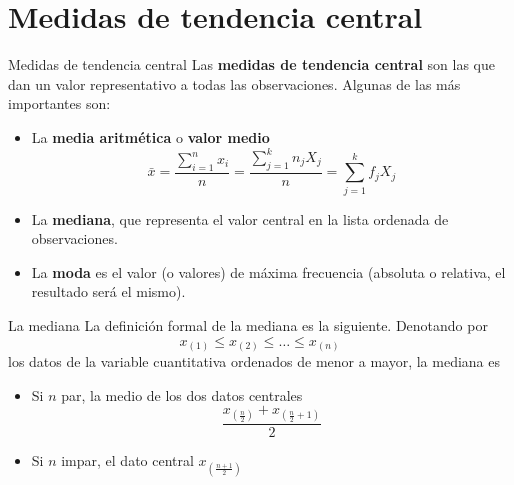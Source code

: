 \documentclass[
  ignorenonframetext,
  aspectratio=169]{beamer}
\providecommand{\tightlist}{%
  \setlength{\itemsep}{0pt}\setlength{\parskip}{0pt}}
\begin{document}
\hypertarget{medidas-de-tendencia-central}{%
\section{Medidas de tendencia
central}\label{medidas-de-tendencia-central}}

\begin{frame}{Medidas de tendencia central}
\protect\hypertarget{medidas-de-tendencia-central-1}{}
Las \textbf{medidas de tendencia central} son las que dan un valor
representativo a todas las observaciones. Algunas de las más importantes
son:

\begin{itemize}
\tightlist
\item
  La \textbf{media aritmética} o \textbf{valor medio}
  \[\bar{x} = \frac{\sum_{i=1}^nx_i}{n}=\frac{\sum_{j=1}^kn_jX_j}{n}=\sum_{j=1}^kf_jX_j\]
\item
  La \textbf{mediana}, que representa el valor central en la lista
  ordenada de observaciones.
\item
  La \textbf{moda} es el valor (o valores) de máxima frecuencia
  (absoluta o relativa, el resultado será el mismo).
\end{itemize}
\end{frame}

\begin{frame}{La mediana}
\protect\hypertarget{la-mediana}{}
La definición formal de la mediana es la siguiente. Denotando por
\[x_{(1)}\le x_{(2)}\le\dots\le x_{(n)}\] los datos de la variable
cuantitativa ordenados de menor a mayor, la mediana es

\begin{itemize}
\tightlist
\item
  Si \(n\) par, la medio de los dos datos centrales
  \[\frac{x_{(\frac{n}{2})}+x_{(\frac{n}{2}+1)}}{2}\]
\item
  Si \(n\) impar, el dato central \(x_{(\frac{n+1}{2})}\)
\end{itemize}
\end{frame}
\end{document}
